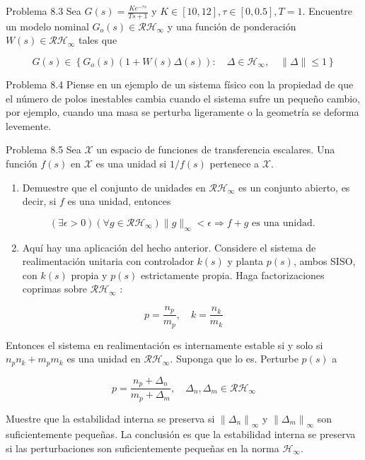 Problema 8.3 Sea $G(s)=\frac{K e^{-\tau s}}{T s+1}$ y $K \in[10,12], \tau \in[0,0.5], T=1$. Encuentre un modelo nominal $G_{o}(s) \in \mathcal{R} \mathcal{H}_{\infty}$ y una función de ponderación $W(s) \in \mathcal{R} \mathcal{H}_{\infty}$ tales que

$$
G(s) \in\left\{G_{o}(s)(1+W(s) \Delta(s)): \quad \Delta \in \mathcal{H}_{\infty}, \quad\|\Delta\| \leq 1\right\}
$$

Problema 8.4 Piense en un ejemplo de un sistema físico con la propiedad de que el número de polos inestables cambia cuando el sistema sufre un pequeño cambio, por ejemplo, cuando una masa se perturba ligeramente o la geometría se deforma levemente.

Problema 8.5 Sea $\mathcal{X}$ un espacio de funciones de transferencia escalares. Una función $f(s)$ en $\mathcal{X}$ es una unidad si $1 / f(s)$ pertenece a $\mathcal{X}$.

\begin{enumerate}
  \item Demuestre que el conjunto de unidades en $\mathcal{R} \mathcal{H}_{\infty}$ es un conjunto abierto, es decir, si $f$ es una unidad, entonces
\end{enumerate}


\begin{equation*}
(\exists \epsilon>0)\left(\forall g \in \mathcal{R} \mathcal{H}_{\infty}\right)\|g\|_{\infty}<\epsilon \Longrightarrow f+g \text { es una unidad. } \tag{8.11}
\end{equation*}


\begin{enumerate}
  \setcounter{enumi}{1}
  \item Aquí hay una aplicación del hecho anterior. Considere el sistema de realimentación unitaria con controlador $k(s)$ y planta $p(s)$, ambos SISO, con $k(s)$ propia y $p(s)$ estrictamente propia. Haga factorizaciones coprimas sobre $\mathcal{R} \mathcal{H}_{\infty}$ :
\end{enumerate}

$$
p=\frac{n_{p}}{m_{p}}, \quad k=\frac{n_{k}}{m_{k}}
$$

Entonces el sistema en realimentación es internamente estable si y solo si $n_{p} n_{k}+m_{p} m_{k}$ es una unidad en $\mathcal{R} \mathcal{H}_{\infty}$. Suponga que lo es. Perturbe $p(s)$ a

$$
p=\frac{n_{p}+\Delta_{n}}{m_{p}+\Delta_{m}}, \quad \Delta_{n}, \Delta_{m} \in \mathcal{R} \mathcal{H}_{\infty}
$$

Muestre que la estabilidad interna se preserva si $\left\|\Delta_{n}\right\|_{\infty}$ y $\left\|\Delta_{m}\right\|_{\infty}$ son suficientemente pequeñas. La conclusión es que la estabilidad interna se preserva si las perturbaciones son suficientemente pequeñas en la norma $\mathcal{H}_{\infty}$.

